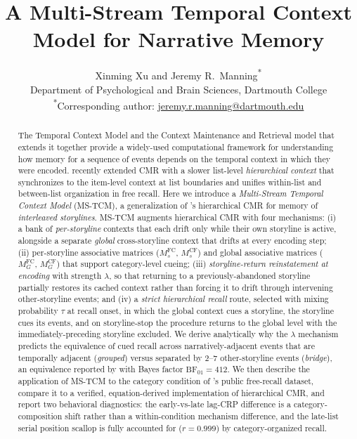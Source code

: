 \documentclass[10pt]{article}
\title{A Multi-Stream Temporal Context Model for Narrative Memory}
\author{Xinming Xu and Jeremy R.\ Manning\textsuperscript{*}\\
  Department of Psychological and Brain Sciences, Dartmouth College\\
  \textsuperscript{*}Corresponding author: \href{mailto:jeremy.r.manning@dartmouth.edu}{jeremy.r.manning@dartmouth.edu}
}
\date{}
\newcommand{\MCFG}{M^{\mathrm{CF}}_{G}}
\newcommand{\MCFs}{M^{\mathrm{CF}}_{s}}
\newcommand{\MFCG}{M^{\mathrm{FC}}_{G}}
\newcommand{\MFCs}{M^{\mathrm{FC}}_{s}}
\newcommand{\tauinit}{\tau}
\begin{document}
\maketitle

\begin{abstract}
The Temporal Context Model \citep{HowaKaha02a} and the Context
Maintenance and Retrieval model that extends it \citep{PolyEtal09}
together provide a widely-used computational framework for understanding
how memory for a sequence of events depends on the temporal context in
which they were encoded. \citet{CornellZhang2025} recently extended CMR
with a slower list-level \emph{hierarchical context} that synchronizes
to the item-level context at list boundaries and unifies within-list
and between-list organization in free recall. Here we introduce a
\emph{Multi-Stream Temporal Context Model} (MS-TCM), a generalization
of \citeauthor{CornellZhang2025}'s hierarchical CMR for memory of
\emph{interleaved storylines}. MS-TCM augments hierarchical CMR with
four mechanisms: (i) a bank of \emph{per-storyline} contexts that
each drift only while their own storyline is active, alongside a
separate \emph{global} cross-storyline context that drifts at every
encoding step; (ii) per-storyline associative matrices ($\MFCs$,
$\MCFs$) and global associative matrices ($\MFCG$, $\MCFG$) that
support category-level cueing; (iii) \emph{storyline-return
reinstatement at encoding} with strength $\lambda$, so that returning
to a previously-abandoned storyline partially restores its cached
context rather than forcing it to drift through intervening
other-storyline events; and (iv) a \emph{strict hierarchical recall}
route, selected with mixing probability $\tauinit$ at recall onset, in
which the global context cues a storyline, the storyline cues its
events, and on storyline-stop the procedure returns to the global
level with the immediately-preceding storyline excluded. We derive
analytically why the $\lambda$ mechanism predicts the equivalence of
cued recall across narratively-adjacent events that are temporally
adjacent (\emph{grouped}) versus separated by 2--7 other-storyline
events (\emph{bridge}), an equivalence reported by
\citet{XuDuncanManning} with Bayes factor $\mathrm{BF}_{01} = 412$. We
then describe the application of MS-TCM to the category condition of
\citet{ManningEtAl2023FRFR}'s public free-recall dataset, compare it
to a verified, equation-derived implementation of
\citeauthor{CornellZhang2025} hierarchical CMR, and report two
behavioral diagnostics: the early-vs-late lag-CRP difference is a
category-composition shift rather than a within-condition mechanism
difference, and the late-list serial position scallop is fully
accounted for ($r = 0.999$) by category-organized recall.
\end{abstract}
\end{document}
